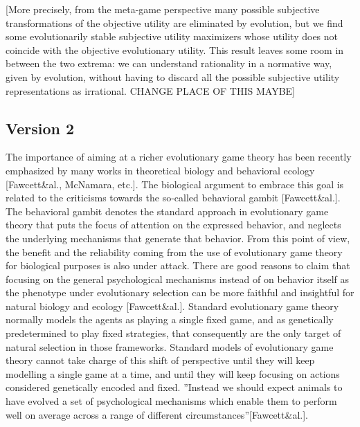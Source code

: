 \documentclass[fleqn,reqno,11pt]{article}
\begin{document}
[More precisely, from the meta-game perspective many possible subjective
transformations of the objective utility are eliminated by evolution, but we find some
evolutionarily stable subjective utility maximizers whose utility does not coincide with the
objective evolutionary utility. This result leaves some room in between the two extrema: we can
understand rationality in a normative way, given by evolution, without having to discard all
the possible subjective utility representations as irrational. CHANGE PLACE OF THIS MAYBE]



\subsection{Version 2}

The importance of aiming at a richer evolutionary game theory has been recently emphasized by many works in theoretical biology and behavioral ecology [Fawcett\&al., McNamara, etc.]. The biological argument to embrace this goal is related to the criticisms towards the so-called behavioral gambit [Fawcett\&al.]. The behavioral gambit denotes the standard approach in evolutionary game theory that puts the focus of attention on the expressed behavior, and neglects the underlying mechanisms that generate that behavior. From this point of view, the benefit and the reliability coming from the use of evolutionary game theory for biological purposes is also under attack. There are good reasons to claim that focusing on the general psychological mechanisms instead of on behavior itself as the phenotype under evolutionary selection can be more faithful and insightful for natural biology and ecology [Fawcett\&al.].
Standard evolutionary game theory normally models the agents as playing a single fixed game, and as genetically predetermined to play fixed strategies, that consequently are the only target of natural selection in those frameworks. Standard models of evolutionary game theory cannot take charge of this shift of perspective until they will keep modelling a single game at a time, and until they will keep focusing on actions considered genetically encoded and fixed. ''Instead we should expect animals to have evolved a set of psychological mechanisms which enable them to perform well on average across a range of different circumstances''[Fawcett\&al.].
\end{document}
